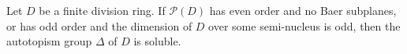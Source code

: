 Let $D$ be a finite division ring. If $\mathcal{P}(D)$ has even order and no Baer subplanes, or has odd order and the dimension of $D$ over some semi-nucleus is odd, then the autotopism group $\Delta$ of $D$ is soluble.
